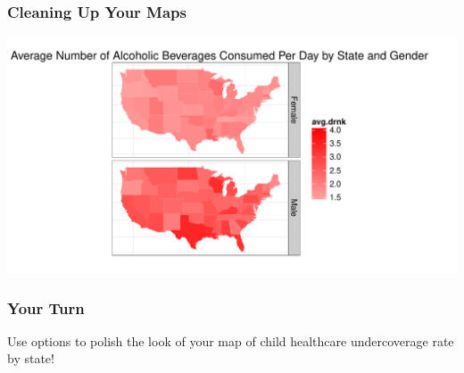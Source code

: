 \documentclass{beamer}\usepackage[]{graphicx}\usepackage[]{color}
\newenvironment{knitrout}{}{} %
\begin{document}

\begin{frame}[fragile]
    \frametitle{Cleaning Up Your Maps}

\begin{knitrout}\footnotesize
{}\color{fgcolor}
\includegraphics[width=\textwidth]{figure/kalcohol5} 

\end{knitrout}
\end{frame}



\begin{frame}
    \frametitle{Your Turn}
    Use options to polish the look of your map of child healthcare undercoverage rate by state!
    
\end{frame}
\end{document}
